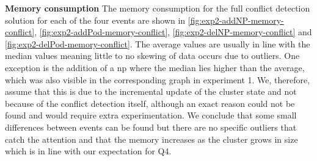 \textbf{Memory consumption}
\newline The memory consumption for the full conflict detection solution for each of the four events are shown in \autoref{fig:exp2-addNP-memory-conflict}, \autoref{fig:exp2-addPod-memory-conflict}, \autoref{fig:exp2-delNP-memory-conflict} and \autoref{fig:exp2-delPod-memory-conflict}. The average values are usually in line with the median values meaning little to no skewing of data occurs due to outliers. One exception is the addition of a \acrshort{np} where the median lies higher than the average, which was also visible in the corresponding graph in experiment 1. We, therefore, assume that this is due to the incremental update of the cluster state and not because of the conflict detection itself, although an exact reason could not be found and would require extra experimentation. We conclude that some small differences between events can be found but there are no specific outliers that catch the attention and that the memory increases as the cluster grows in size which is in line with our expectation for Q4.

